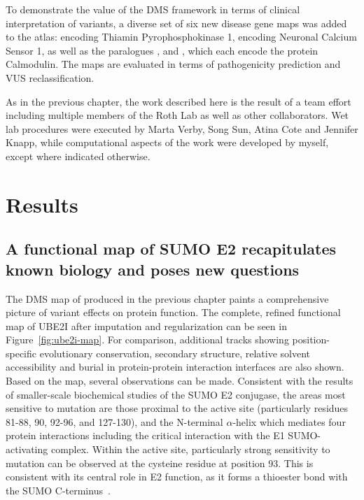 To demonstrate the value of the DMS framework in terms of clinical interpretation of variants, a diverse set of six new disease gene maps was added to the atlas:  encoding Thiamin Pyrophosphokinase 1,  encoding Neuronal Calcium Sensor 1, as well as the paralogues ,  and , which each encode the protein Calmodulin. The maps are evaluated in terms of pathogenicity prediction and VUS reclassification.

As in the previous chapter, the work described here is the result of a team effort including multiple members of the Roth Lab as well as other collaborators. Wet lab procedures were executed by Marta Verby, Song Sun, Atina Cote and Jennifer Knapp, while computational aspects of the work were developed by myself, except where indicated otherwise.

\section{Results}


\subsection{A functional map of SUMO E2 recapitulates known biology and poses new questions}


The DMS map of  produced in the previous chapter paints a comprehensive picture of variant effects on protein function. The complete, refined functional map of UBE2I after imputation and regularization can be seen in Figure~\ref{fig:ube2i-map}. For comparison, additional tracks showing position-specific evolutionary conservation, secondary  structure, relative solvent accessibility and burial in protein-protein interaction interfaces are also shown.  
Based on the map, several observations can be made. Consistent with the results of smaller-scale biochemical studies of the SUMO E2 conjugase\cite{bencsath_identification_2002,bernier-villamor_structural_2002}, the areas most sensitive to mutation are those proximal to the active site (particularly residues 81-88, 90, 92-96, and 127-130), and the N-terminal $\alpha$-helix which mediates four protein interactions including the critical interaction with the E1 SUMO-activating complex. Within the active site, particularly strong sensitivity to mutation can be observed at the cysteine residue at position 93. This is consistent with its central role in E2 function, as it forms a thioester bond with the SUMO C-terminus~\cite{bernier-villamor_structural_2002}.

